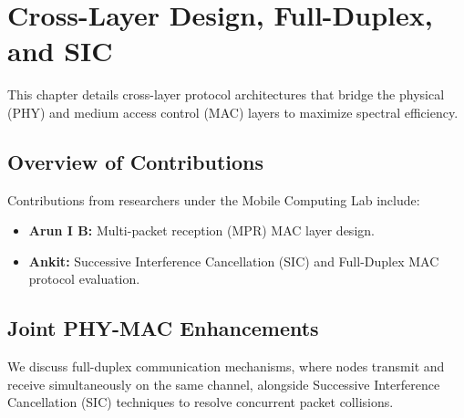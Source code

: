 \chapter{Cross-Layer Design, Full-Duplex, and SIC}
\label{sec:chapter10}

This chapter details cross-layer protocol architectures that bridge the physical (PHY) and medium access control (MAC) layers to maximize spectral efficiency.

\section{Overview of Contributions}
Contributions from researchers under the Mobile Computing Lab include:
\begin{itemize}
    \item \textbf{Arun I B:} Multi-packet reception (MPR) MAC layer design.
    \item \textbf{Ankit:} Successive Interference Cancellation (SIC) and Full-Duplex MAC protocol evaluation.
\end{itemize}

\section{Joint PHY-MAC Enhancements}
We discuss full-duplex communication mechanisms, where nodes transmit and receive simultaneously on the same channel, alongside Successive Interference Cancellation (SIC) techniques to resolve concurrent packet collisions.
